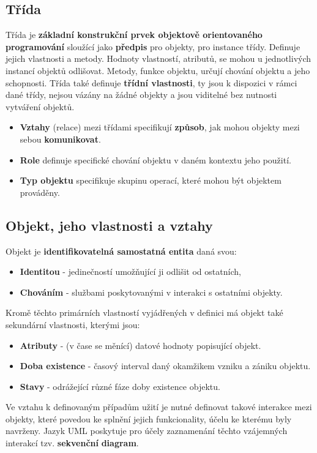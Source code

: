 \subsection{Třída}
Třída je \textbf{základní konstrukční prvek objektově orientovaného programování} sloužící jako \textbf{předpis} pro objekty, pro instance třídy. Definuje jejich vlastnosti a metody. Hodnoty vlastností, atributů, se mohou u jednotlivých instancí objektů odlišovat. Metody, funkce objektu, určují chování objektu a jeho schopnosti. Třída také definuje \textbf{třídní vlastnosti}, ty jsou k dispozici v rámci dané třídy, nejsou vázány na žádné objekty a jsou viditelné bez nutnosti vytváření objektů.

\begin{itemize}
\item \textbf{Vztahy} (relace) mezi třídami specifikují \textbf{způsob}, jak mohou objekty mezi sebou \textbf{komunikovat}.
\item \textbf{Role} definuje specifické chování objektu v daném kontextu jeho použití.
\item \textbf{Typ objektu} specifikuje skupinu operací, které mohou být objektem prováděny.
\end{itemize}

\subsection{Objekt, jeho vlastnosti a vztahy}
Objekt je \textbf{identifikovatelná samostatná entita} daná svou: 
\begin{itemize}
\item \textbf{Identitou} - jedinečností umožňující ji odlišit od ostatních, 
\item \textbf{Chováním} - službami poskytovanými v interakci s ostatními objekty.  
\end{itemize}
Kromě těchto primárních vlastností vyjádřených v definici má objekt také sekundární vlastnosti, kterými jsou: 
\begin{itemize}
\item \textbf{Atributy} - (v čase se měnící) datové hodnoty popisující objekt.
\item \textbf{Doba existence} - časový interval daný okamžikem vzniku a zániku objektu.
\item \textbf{Stavy} - odrážející různé fáze doby existence objektu.
\end{itemize}
Ve vztahu k definovaným případům užití je nutné definovat takové interakce mezi objekty, které povedou ke splnění jejich funkcionality, účelu ke kterému byly navrženy. Jazyk UML poskytuje pro účely zaznamenání těchto vzájemných interakcí tzv. \textbf{sekvenční} \textbf{diagram}.


